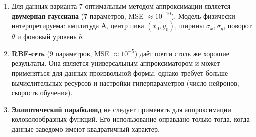 \begin{enumerate}
    \item Для данных варианта 7 оптимальным методом аппроксимации является \textbf{двумерная гауссиана} (7 параметров, MSE $\approx 10^{-10}$). Модель физически интерпретируема: амплитуда А, центр пика $(x_0, y_0)$, ширины $\sigma_x, \sigma_y$, поворот $\theta$ и фоновый уровень $b$.

    \item \textbf{RBF-сеть} (9 параметров, MSE $\approx 10^{-5}$) даёт почти столь же хорошие результаты. Она является универсальным аппроксиматором и может применяться для данных произвольной формы, однако требует больше вычислительных ресурсов и настройки гиперпараметров (число нейронов, скорость обучения).

    \item \textbf{Эллиптический параболоид} не следует применять для аппроксимации колоколообразных функций. Его использование оправдано только тогда, когда данные заведомо имеют квадратичный характер.
\end{enumerate}
